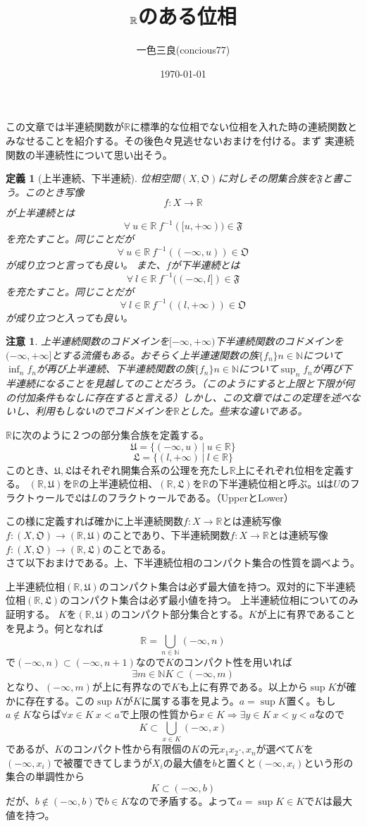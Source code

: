 \documentclass[leqno]{jsarticle}
\title{$\rr$のある位相}
\author{一色三良(concious77)}
\date{\today}
\newtheorem{df}[thm]{定義}
\newtheorem*{cau}{注意}
\newcommand{\To}{\Longrightarrow}
\newcommand{\nn}{\mathbb{N}}
\newcommand{\rr}{\mathbb{R}}
\newcommand{\mgn}{\infty}
\newcommand{\oo}{\mathfrak{O}}
\newcommand{\uu}{\mathfrak{U}}
\newcommand{\LL}{\mathfrak{L}}
\begin{document}
\maketitle
この文章では半連続関数が$\rr$に標準的な位相でない位相を入れた時の連続関数とみなせることを紹介する。その後色々見逃せないおまけを付ける。まず
実連続関数の半連続性について思い出そう。
\begin{df}[上半連続、下半連続]
位相空間$(X,\mathfrak{O})$に対しその閉集合族を$\mathfrak{F}$と書こう。このとき写像
\[
f:X\rightarrow \rr
\]
が上半連続とは
\[
\forall \ u\in \rr\ f^{-1}([u,+\mgn))\in \mathfrak{F}
\]
を充たすこと。同じことだが
\[
\forall \ u\in \rr\ f^{-1}((-\mgn,u))\in \mathfrak{O}
\]
が成り立つと言っても良い。
また、$f$が下半連続とは
\[
\forall \ l\in \rr\ f^{-1}((-\mgn,l])\in \mathfrak{F}
\]
を充たすこと。同じことだが
\[
\forall \ l\in \rr\ f^{-1}((l,+\mgn))\in \mathfrak{O}
\]
が成り立つと入っても良い。
\end{df}
\begin{cau}
上半連続関数のコドメインを$[-\mgn,+\mgn)$下半連続関数のコドメインを$(-\mgn,+\mgn]$とする流儀もある。おそらく上半連速関数の族$\{f_n\}{n\in\nn}$について$\inf_n f_{n}$が再び上半連続、下半連続関数の族$\{f_n\}{n\in\nn}$について$\sup_n f_n$が再び下半連続になることを見越してのことだろう。（このようにすると上限と下限が何の付加条件もなしに存在すると言える）しかし、この文章ではこの定理を述べないし、利用もしないのでコドメインを$\rr$とした。些末な違いである。
\end{cau}

{
$\rr$に次のように２つの部分集合族を定義する。
\[
\uu=\{(-\mgn,u)\ |\ u\in\rr\}
\]
\[
\LL=\{(l,+\mgn)\ |\ l\in\rr\}
\]
このとき、$\uu,\LL$はそれぞれ開集合系の公理を充たし$\rr$上にそれぞれ位相を定義する。
$(\rr,\uu)$を$\rr$の上半連続位相、$(\rr,\LL)$を$\rr$の下半連続位相と呼ぶ。$\uu$は$U$のフラクトゥールで$\LL$は$L$のフラクトゥールである。（UpperとLower）
}

この様に定義すれば確かに上半連続関数$f:X\to \rr$とは連続写像$f:(X,\oo)\to (\rr,\uu)$のことであり、下半連続関数$f:X\to \rr$とは連続写像$f:(X,\oo)\to (\rr,\LL)$のことである。\\ 
さて以下おまけである。上、下半連続位相のコンパクト集合の性質を調べよう。

{\prop
上半連続位相$(\rr,\uu)$のコンパクト集合は必ず最大値を持つ。双対的に下半連続位相$(\rr,\LL)$のコンパクト集合は必ず最小値を持つ。
}
{\proof 上半連続位相についてのみ証明する。
$K$を$(\rr,\uu)$のコンパクト部分集合とする。$K$が上に有界であることを見よう。何となれば
\[
\rr=\bigcup_{n\in \nn}(-\mgn,n)
\]
で$(-\mgn,n)\subset (-\mgn,n+1)$なので$K$のコンパクト性を用いれば
\[
\exists m\in\nn K\subset (-\mgn,m)
\]
となり、$(-\mgn,m)$が上に有界なので$K$も上に有界である。以上から$\sup K$が確かに存在する。この$\sup K$が$K$に属する事を見よう。$a=\sup K$置く。もし$a\not\in K$ならば$\forall x\in K\ x<a$で上限の性質から$x\in K\To \exists y\in K \ x<y<a$なので
\[
K\subset \bigcup_{x\in K}(-\mgn,x)
\]
であるが、$K$のコンパクト性から有限個の$K$の元$x_1x_2\cdot,x_n$が選べて$K$を$(-\mgn,x_i)$で被覆できてしまうが$X_i$の最大値を$b$と置くと$(-\mgn,x_i)$という形の集合の単調性から
\[
K\subset (-\mgn,b)
\]
だが、$b\not\in (-\mgn,b)$で$b\in K$なので矛盾する。よって$a=\sup K\in K$で$K$は最大値を持つ。
}
\end{document}

